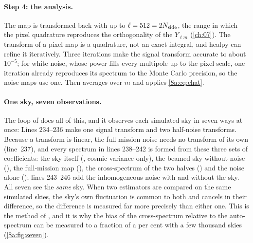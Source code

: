\paragraph{Step 4: the analysis.}
The map is transformed back with  up to $\ell=512=2N_{\rm side}$, the
range in which the pixel quadrature reproduces the orthogonality of the $Y_{\ell m}$
(\cref{ch:07}). The transform of a pixel map is a quadrature, not an exact integral, and
healpy can refine it iteratively. Three iterations make the signal transform accurate to
about $10^{-5}$; for white noise, whose power fills every multipole up to the pixel scale, one
iteration already reproduces its spectrum to the Monte Carlo precision, so the noise maps use
one. Then  averages over $m$ and  applies \eqref{8a:eq:chat}.

\paragraph{One sky, seven observations.}
The loop of  does all of this, and it observes each simulated sky in seven
ways at once:
Lines 234--236 make one signal transform and two half-noise transforms. Because a transform is
linear, the full-mission noise needs no transform of its own (line~237), and every spectrum
in lines 238--242 is formed from these three sets of coefficients: the sky itself
(, cosmic variance only), the beamed sky without noise (), the
full-mission map (), the cross-spectrum of the two halves () and the
noise alone (); lines 243--246 add the inhomogeneous noise with and without the
sky. All seven see the \emph{same} sky. When two estimators are compared on the same
simulated skies, the sky's own fluctuation is common to both and cancels in their difference,
so the difference is measured far more precisely than either one. This is the method of
, and it is why the bias of the cross-spectrum relative to
the auto-spectrum can be measured to a fraction of a per cent with a few thousand skies
(\cref{8a:fig:seven}).

